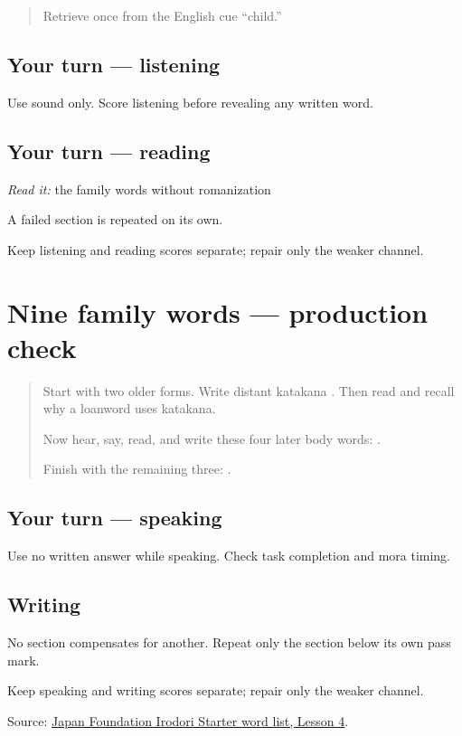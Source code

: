 \label{lesson:JA-C13-family-reception}



\begin{quote}
Retrieve \textbf{} once from the English cue “child.”
\end{quote}

\subsection*{Your turn — listening}
Use sound only. Score listening before revealing any written word.

\subsection*{Your turn — reading}
\emph{Read it:} the family words without romanization

A failed section is repeated on its own.

\begin{tcolorbox}[breakable,colback=teal!4,colframe=teal!35!black,title={Before you move on}]
Keep listening and reading scores separate; repair only the weaker channel.
\end{tcolorbox}
\section[Practice]{Nine family words — production check}

\label{lesson:JA-C13-family-check}



\begin{quote}
Start with two older forms. Write distant katakana \textbf{}. Then read \textbf{} and recall why a loanword uses katakana.

Now hear, say, read, and write these four later body words: \textbf{}.

Finish with the remaining three: \textbf{}.
\end{quote}

\subsection*{Your turn — speaking}
Use no written answer while speaking. Check task completion and mora timing.

\subsection*{Writing}
No section compensates for another. Repeat only the section below its own pass mark.

\begin{tcolorbox}[breakable,colback=teal!4,colframe=teal!35!black,title={Before you move on}]
Keep speaking and writing scores separate; repair only the weaker channel.

Source: \href{https://www.irodori.jpf.go.jp/assets/data/wordlist\_X.pdf}{Japan Foundation Irodori Starter word list, Lesson 4}.
\end{tcolorbox}
